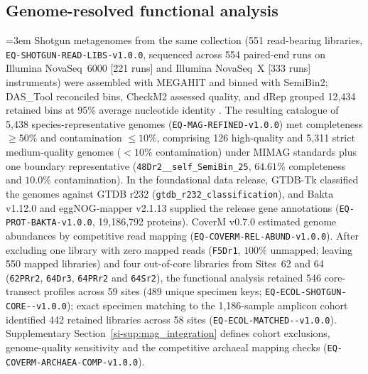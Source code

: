 \subsection*{Genome-resolved functional analysis}
\label{methods:mag_lifeonair}
{\emergencystretch=3em
Shotgun metagenomes from the same collection (551 read-bearing libraries, \texttt{EQ-\allowbreak SHOTGUN-\allowbreak READ-\allowbreak LIBS-\allowbreak v1.0.0}, sequenced across 554 paired-end runs on Illumina NovaSeq~6000 [221 runs] and Illumina NovaSeq~X [333 runs] instruments) were assembled with MEGAHIT and binned with SemiBin2; DAS\_Tool reconciled bins, CheckM2 assessed quality, and dRep grouped 12,434 retained bins at 95\% average nucleotide identity \cite{li2015megahit,pan2023semibin2,sieber2018dastool,chklovski2023checkm2,olm2017drep}. The resulting catalogue of 5,438 species-representative genomes (\texttt{EQ-\allowbreak MAG-\allowbreak REFINED-\allowbreak v1.0.0}) met completeness $\ge 50\%$ and contamination $\le 10\%$, comprising 126 high-quality and 5,311 strict medium-quality genomes ($<10\%$ contamination) under MIMAG standards plus one boundary representative (\texttt{48Dr2\_\_\allowbreak self\_\allowbreak SemiBin\_25}, $64.61\%$ completeness and $10.0\%$ contamination). In the foundational data release, GTDB-Tk classified the genomes against GTDB r232 (\texttt{gtdb\_\allowbreak r232\_\allowbreak classification}), and Bakta v1.12.0 and eggNOG-mapper v2.1.13 supplied the release gene annotations (\texttt{EQ-\allowbreak PROT-\allowbreak BAKTA-\allowbreak v1.0.0}, 19,186,792 proteins). CoverM v0.7.0 estimated genome abundances by competitive read mapping (\texttt{EQ-\allowbreak COVERM-\allowbreak REL-\allowbreak ABUND-\allowbreak v1.0.0}). After excluding one library with zero mapped reads (\texttt{F5Dr1}, $100\%$ unmapped; leaving 550 mapped libraries) and four out-of-core libraries from Sites~62 and 64 (\texttt{62PRr2}, \texttt{64Dr3}, \texttt{64PRr2} and \texttt{64Sr2}), the functional analysis retained 546 core-transect profiles across 59 sites (489 unique specimen keys; \texttt{EQ-\allowbreak ECOL-\allowbreak SHOTGUN-\allowbreak CORE--\allowbreak v1.0.0}); exact specimen matching to the 1,186-sample amplicon cohort identified 442 retained libraries across 58 sites (\texttt{EQ-\allowbreak ECOL-\allowbreak MATCHED--\allowbreak v1.0.0}). Supplementary Section~\ref{si-sup:mag_integration} defines cohort exclusions, genome-quality sensitivity and the competitive archaeal mapping checks (\texttt{EQ-\allowbreak COVERM-\allowbreak ARCHAEA-\allowbreak COMP-\allowbreak v1.0.0}).

}
